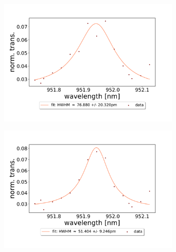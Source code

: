 \begin{figure}[h!]
\begin{subfigure}[b]{0.49\textwidth}
        \includegraphics[width=\textwidth]{figures/results/double fano fits/20250326/53um_M3:M5_fit_3.pdf}
        \caption{}
        \label{fig:53um_M3:M5_fit_3}
    \end{subfigure}
    \begin{subfigure}[b]{0.49\textwidth}
        \includegraphics[width=\textwidth]{figures/results/double fano fits/20250326/53um_M3:M5_fit_4.pdf}
        \caption{}
        \label{fig:53um_M3:M5_fit_4}
    \end{subfigure}
    \begin{subfigure}[b]{0.49\textwidth}

\end{subfigure}
\end{figure}
